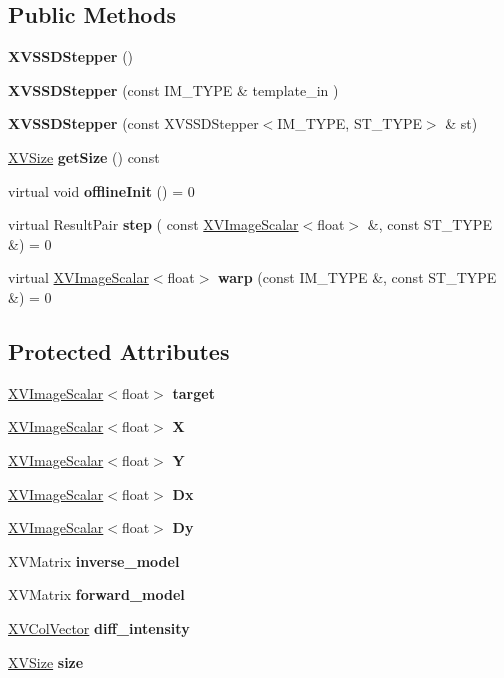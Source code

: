 \subsection*{Public Methods}
\begin{CompactItemize}
\item 
{\bf XVSSDStepper} ()
\item 
\label{XVSSDStepper_a1}
\hypertarget{class_XVSSDStepper_a1}{
{\bf XVSSDStepper} (const IM\_\-TYPE \& template\_\-in )}

\item 
{\bf XVSSDStepper} (const XVSSDStepper$<$IM\_\-TYPE, ST\_\-TYPE$>$ \& st)
\item 
\hyperlink{class_XVSize}{XVSize} {\bf get\-Size} () const
\item 
\label{XVSSDStepper_a4}
\hypertarget{class_XVSSDStepper_a4}{
virtual void {\bf offline\-Init} () = 0}

\item 
\label{XVSSDStepper_a5}
\hypertarget{class_XVSSDStepper_a5}{
virtual Result\-Pair {\bf step} ( const \hyperlink{class_XVImageScalar}{XVImage\-Scalar}$<$float$>$ \&, const ST\_\-TYPE \&) = 0}

\item 
\label{XVSSDStepper_a6}
\hypertarget{class_XVSSDStepper_a6}{
virtual \hyperlink{class_XVImageScalar}{XVImage\-Scalar}$<$float$>$ {\bf warp} (const IM\_\-TYPE \&, const ST\_\-TYPE \&) = 0}

\end{CompactItemize}
\subsection*{Protected Attributes}
\begin{CompactItemize}
\item 
\hyperlink{class_XVImageScalar}{XVImage\-Scalar}$<$float$>$ {\bf target}
\item 
\hyperlink{class_XVImageScalar}{XVImage\-Scalar}$<$float$>$ {\bf X}
\item 
\hyperlink{class_XVImageScalar}{XVImage\-Scalar}$<$float$>$ {\bf Y}
\item 
\hyperlink{class_XVImageScalar}{XVImage\-Scalar}$<$float$>$ {\bf Dx}
\item 
\hyperlink{class_XVImageScalar}{XVImage\-Scalar}$<$float$>$ {\bf Dy}
\item 
XVMatrix {\bf inverse\_\-model}
\item 
XVMatrix {\bf forward\_\-model}
\item 
\hyperlink{class_XVColVector}{XVCol\-Vector} {\bf diff\_\-intensity}
\item 
\hyperlink{class_XVSize}{XVSize} {\bf size}
\end{CompactItemize}


